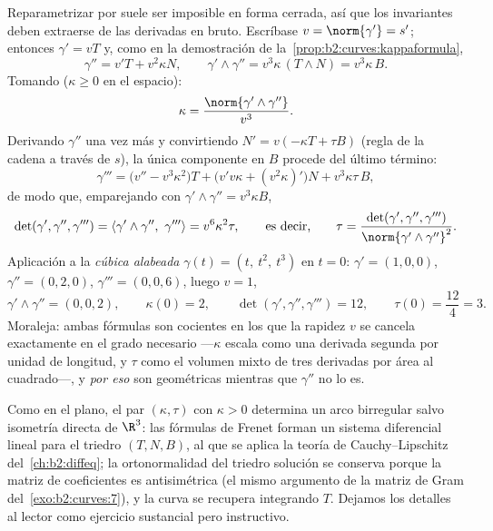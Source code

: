 \begin{example}\label{ex:b2:curves:twistedcubic}
Reparametrizar por  suele ser imposible en forma
cerrada, así que los invariantes deben extraerse de las derivadas en
bruto. Escríbase $v = \norm{\gamma'} = s'$; entonces $\gamma' = vT$
y, como en la demostración de la~\cref{prop:b2:curves:kappaformula},
\[
\gamma'' = v'T + v^2\kappa N,
\qquad
\gamma' \wedge \gamma'' = v^3\kappa\,(T \wedge N) =
v^3\kappa\,B .
\]
Tomando  ($\kappa \geq 0$ en el espacio):
\[
\kappa = \frac{\norm{\gamma' \wedge \gamma''}}{v^3} .
\]
Derivando $\gamma''$ una vez más y convirtiendo $N' = v(-\kappa T +
\tau B)$ (regla de la cadena a través de $s$), la única componente en
$B$ procede del último término:
\[
\gamma''' = \bigl(v'' - v^3\kappa^2\bigr)T +
\bigl(v'v\kappa + (v^2\kappa)'\bigr)N + v^3\kappa\tau\,B,
\]
de modo que, emparejando con $\gamma' \wedge \gamma'' = v^3\kappa B$,
\[
\det(\gamma', \gamma'', \gamma''') = \langle\gamma' \wedge
\gamma'',\ \gamma'''\rangle = v^6\kappa^2\tau,
\qquad\text{es decir,}\qquad
\tau = \frac{\det(\gamma', \gamma'',
\gamma''')}{\norm{\gamma' \wedge \gamma''}^2} .
\]
Aplicación a la \emph{cúbica alabeada} $\gamma(t) = (t,\ t^2,\ t^3)$
en $t = 0$: $\gamma' = (1, 0, 0)$, $\gamma'' = (0, 2, 0)$, $\gamma'''
= (0, 0, 6)$, luego $v = 1$,
\[
\gamma' \wedge \gamma'' = (0, 0, 2), \qquad \kappa(0) = 2,
\qquad
\det(\gamma', \gamma'', \gamma''') = 12, \qquad \tau(0) =
\frac{12}{4} = 3 .
\]
Moraleja: ambas fórmulas son cocientes en los que la rapidez $v$ se
cancela exactamente en el grado necesario ---$\kappa$ escala como una
derivada segunda por unidad de longitud, y $\tau$ como el volumen
mixto de tres derivadas por área al cuadrado---, y \emph{por eso} son
geométricas mientras que $\gamma''$ no lo es.
\end{example}

\begin{remark}
Como en el plano, el par $(\kappa, \tau)$ con $\kappa > 0$ determina
un arco birregular salvo isometría directa de $\R^3$: las fórmulas de
Frenet forman un sistema diferencial lineal para el triedro $(T, N,
B)$, al que se aplica la teoría de Cauchy--Lipschitz del~\cref{ch:b2:diffeq}; la ortonormalidad del triedro solución se
conserva porque la matriz de coeficientes es antisimétrica (el mismo
argumento de la matriz de Gram del~\cref{exo:b2:curves:7}), y la
curva se recupera integrando $T$. Dejamos los detalles al lector como
ejercicio sustancial pero instructivo.
\end{remark}

